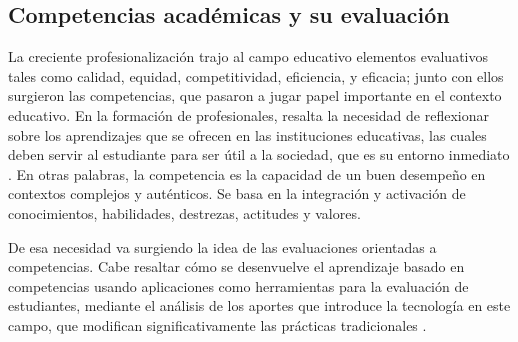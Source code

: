 

\subsection{Competencias académicas y su evaluación}
La creciente profesionalización trajo al campo educativo elementos evaluativos tales como calidad, equidad, competitividad, eficiencia, y eficacia; junto con ellos surgieron las competencias, que pasaron a jugar papel importante en el contexto educativo. En la formación de profesionales, resalta la necesidad de reflexionar sobre los aprendizajes que se ofrecen en las instituciones educativas, las cuales deben servir al estudiante para ser útil a la sociedad, que es su entorno inmediato \citep{kuh_using_2015}. En otras palabras, la competencia es la capacidad de un buen desempeño en contextos complejos y auténticos. Se basa en la integración y activación de conocimientos, habilidades, destrezas, actitudes y valores.

De esa necesidad va surgiendo la idea de las evaluaciones orientadas a competencias. Cabe resaltar cómo se desenvuelve el aprendizaje basado en competencias usando aplicaciones como herramientas para la evaluación de estudiantes, mediante el análisis de los aportes que introduce la tecnología en este campo, que modifican significativamente las prácticas tradicionales \citep{carriveau_connecting_2016}.


